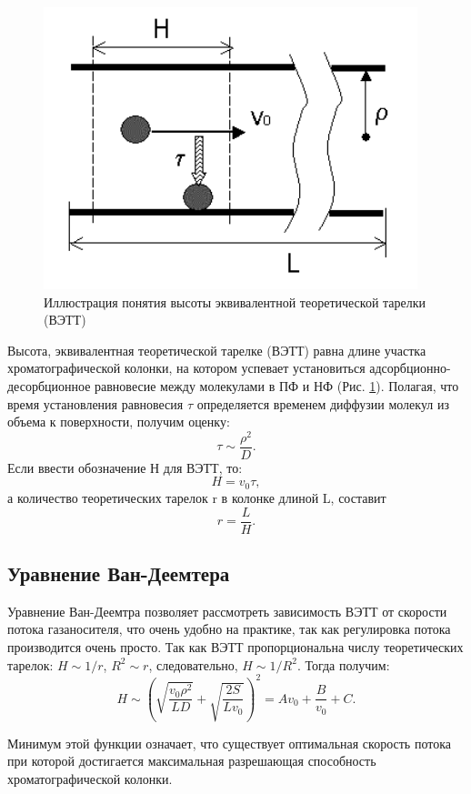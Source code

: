 \documentclass{article}
\begin{document}
\begin{figure}[h!]
    \centering
    \includegraphics[width=0.5\linewidth]{Images/ВЭТТ.png}
    \caption{Иллюстрация понятия высоты эквивалентной теоретической тарелки (ВЭТТ)}
    \label{fig:ВЭТТ}
\end{figure}
\par Высота, эквивалентная теоретической тарелке (ВЭТТ) равна длине участка хроматографической колонки, на котором успевает установиться адсорбционно-десорбционное равновесие между молекулами в ПФ и НФ (Рис. \ref{fig:ВЭТТ}). Полагая, что время установления равновесия $\tau$
определяется временем диффузии молекул из объема к поверхности, получим оценку:
\begin{equation}
\tau \sim \frac{\rho^2}{D}.
\end{equation}
Если ввести обозначение Н для ВЭТТ, то:
\begin{equation}
H = v_0 \tau, 
\end{equation} 
а количество теоретических тарелок r в колонке длиной L, составит
\begin{equation}
r = \frac{L}{H}.
\end{equation}

\subsection{Уравнение Ван-Деемтера}\;
\par Уравнение Ван-Деемтра позволяет рассмотреть зависимость ВЭТТ от скорости потока газаносителя, что очень удобно на практике, так как регулировка потока производится очень просто. Так как ВЭТТ пропорциональна числу теоретических тарелок: $H \sim 1/r$, $R^2 \sim r$, следовательно, $H \sim 1/R^2$. Тогда получим:
\begin{equation}
H \sim ( \sqrt{\frac{v_0 \rho^2}{LD}} + \sqrt{\frac{2S}{Lv_0}} ) ^2 =  Av_0 + \frac{B}{v_0} + C.
\end{equation}
\par Минимум этой функции означает, что существует оптимальная скорость потока при которой достигается максимальная разрешающая способность хроматографической колонки.
\end{document}

